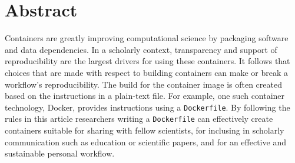 \documentclass[10pt,letterpaper]{article}
\newcommand{\getIndex}[2]{
  \ForEach{,}{\IfEq{#1}{\thislevelitem}{\number\thislevelcount\ExitForEach}{}}{#2}
}
\newcommand{\getAff}[1]{
  \getIndex{#1}{}
}
\begin{document}
\vspace*{0.2in}

\section*{Abstract}
Containers are greatly improving computational science by packaging
software and data dependencies. In a scholarly context, transparency and
support of reproducibility are the largest drivers for using these
containers. It follows that choices that are made with respect to
building containers can make or break a workflow's reproducibility. The
build for the container image is often created based on the instructions
in a plain-text file. For example, one such container technology,
Docker, provides instructions using a \texttt{Dockerfile}. By following
the rules in this article researchers writing a \texttt{Dockerfile} can
effectively create containers suitable for sharing with fellow
scientists, for inclusing in scholarly communication such as education
or scientific papers, and for an effective and sustainable personal
workflow.
\end{document}
